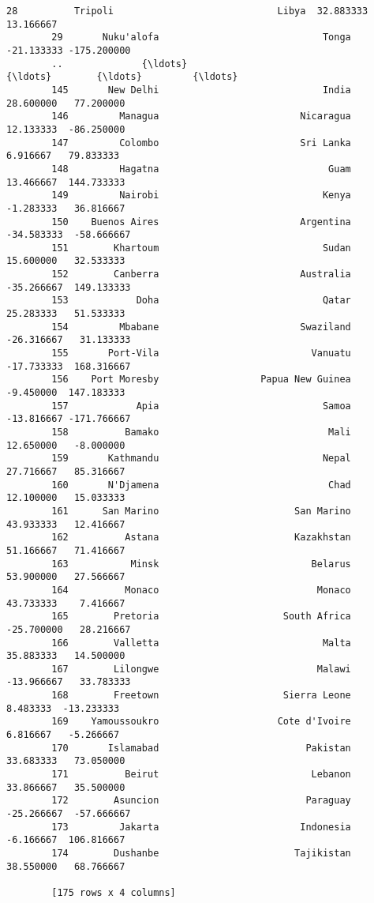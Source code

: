 \documentclass[11pt]{article}
\begin{document}
\begin{Verbatim}[commandchars=\\\{\}]
        28          Tripoli                             Libya  32.883333   13.166667
        29       Nuku'alofa                             Tonga -21.133333 -175.200000
        ..              {\ldots}                               {\ldots}        {\ldots}         {\ldots}
        145       New Delhi                             India  28.600000   77.200000
        146         Managua                         Nicaragua  12.133333  -86.250000
        147         Colombo                         Sri Lanka   6.916667   79.833333
        148         Hagatna                              Guam  13.466667  144.733333
        149         Nairobi                             Kenya  -1.283333   36.816667
        150    Buenos Aires                         Argentina -34.583333  -58.666667
        151        Khartoum                             Sudan  15.600000   32.533333
        152        Canberra                         Australia -35.266667  149.133333
        153            Doha                             Qatar  25.283333   51.533333
        154         Mbabane                         Swaziland -26.316667   31.133333
        155       Port-Vila                           Vanuatu -17.733333  168.316667
        156    Port Moresby                  Papua New Guinea  -9.450000  147.183333
        157            Apia                             Samoa -13.816667 -171.766667
        158          Bamako                              Mali  12.650000   -8.000000
        159       Kathmandu                             Nepal  27.716667   85.316667
        160       N'Djamena                              Chad  12.100000   15.033333
        161      San Marino                        San Marino  43.933333   12.416667
        162          Astana                        Kazakhstan  51.166667   71.416667
        163           Minsk                           Belarus  53.900000   27.566667
        164          Monaco                            Monaco  43.733333    7.416667
        165        Pretoria                      South Africa -25.700000   28.216667
        166        Valletta                             Malta  35.883333   14.500000
        167        Lilongwe                            Malawi -13.966667   33.783333
        168        Freetown                      Sierra Leone   8.483333  -13.233333
        169    Yamoussoukro                     Cote d'Ivoire   6.816667   -5.266667
        170       Islamabad                          Pakistan  33.683333   73.050000
        171          Beirut                           Lebanon  33.866667   35.500000
        172        Asuncion                          Paraguay -25.266667  -57.666667
        173         Jakarta                         Indonesia  -6.166667  106.816667
        174        Dushanbe                        Tajikistan  38.550000   68.766667
        
        [175 rows x 4 columns]
\end{Verbatim}
            
\end{document}
